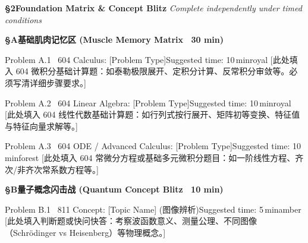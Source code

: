 \documentclass[a4paper,11pt]{article}
\begin{document}
\clearpage

{\Large\sffamily\bfseries\color{navy} \S 2\quad Foundation Matrix \& Concept Blitz}
\hfill{\small\sffamily\color{mist}\itshape Complete independently under timed conditions}

\vspace{6pt}

{\normalsize\sffamily\bfseries\color{royal} \S A\quad 基础肌肉记忆区 (Muscle Memory Matrix \textperiodcentered\ 30 min)}
\vspace{2pt}

\begin{problembox}{Problem A.1 \textbar\ 604 Calculus: [Problem Type]}{Suggested time: 10\,min}{royal}
[此处填入 604 微积分基础计算题：如泰勒极限展开、定积分计算、反常积分审敛等。必须写清详细步骤要求。]
\end{problembox}

\vspace{3pt}

\begin{problembox}{Problem A.2 \textbar\ 604 Linear Algebra: [Problem Type]}{Suggested time: 10\,min}{royal}
[此处填入 604 线性代数基础计算题：如行列式按行展开、矩阵初等变换、特征值与特征向量求解等。]
\end{problembox}

\vspace{3pt}

\begin{problembox}{Problem A.3 \textbar\ 604 ODE / Advanced Calculus: [Problem Type]}{Suggested time: 10\,min}{forest}
[此处填入 604 常微分方程或基础多元微积分题目：如一阶线性方程、齐次/非齐次常系数方程等。]
\end{problembox}

\vspace{6pt}
{\normalsize\sffamily\bfseries\color{amber} \S B\quad 量子概念闪击战 (Quantum Concept Blitz \textperiodcentered\ 10 min)}
\vspace{2pt}

\begin{problembox}{Problem B.1 \textbar\ 811 Concept: [Topic Name] (图像辨析)}{Suggested time: 5\,min}{amber}
[此处填入判断题或快问快答：考察波函数意义、测量公理、不同图像（Schrödinger vs Heisenberg）等物理概念。]
\end{problembox}
\end{document}
